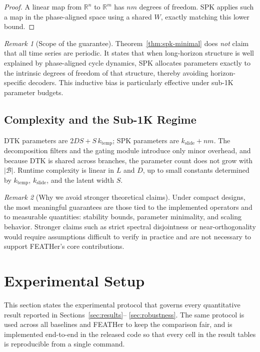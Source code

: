 \documentclass[journal]{IEEEtran}
\theoremstyle{remark}
\newtheorem{remark}{Remark}
\begin{document}
\begin{proof}
A linear map from $\mathbb{R}^n$ to $\mathbb{R}^m$ has $nm$ degrees of
freedom. SPK applies such a map in the phase-aligned space using a
shared $W$, exactly matching this lower bound.
\end{proof}

\begin{remark}[Scope of the guarantee]
\label{rem:spk-scope}
Theorem~\ref{thm:spk-minimal} does \emph{not} claim that all time
series are periodic. It states that when long-horizon structure is
well explained by phase-aligned cycle dynamics, SPK allocates
parameters exactly to the intrinsic degrees of freedom of that
structure, thereby avoiding horizon-specific decoders. This inductive
bias is particularly effective under sub-1K parameter budgets.
\end{remark}

\subsection{Complexity and the Sub-1K Regime}
DTK parameters are $2DS + S\, k_{\mathrm{temp}}$; SPK parameters are
$k_{\mathrm{slide}} + nm$. The decomposition filters and the gating
module introduce only minor overhead, and because DTK is shared across
branches, the parameter count does not grow with $|\mathcal{B}|$.
Runtime complexity is linear in $L$ and $D$, up to small constants
determined by $k_{\mathrm{temp}}$, $k_{\mathrm{slide}}$, and the
latent width $S$.

\begin{remark}[Why we avoid stronger theoretical claims]
\label{rem:scope}
Under compact designs, the most meaningful guarantees are those tied
to the implemented operators and to measurable quantities: stability
bounds, parameter minimality, and scaling behavior. Stronger claims
such as strict spectral disjointness or near-orthogonality would
require assumptions difficult to verify in practice and are not
necessary to support FEATHer's core contributions.
\end{remark}

\section{Experimental Setup}
\label{sec:setup}

This section states the experimental protocol that governs every
quantitative result reported in Sections~\ref{sec:results}--%
\ref{sec:robustness}. The same protocol is used across all baselines
and FEATHer to keep the comparison fair, and is implemented
end-to-end in the released code so that every cell in the result
tables is reproducible from a single command.
\end{document}
